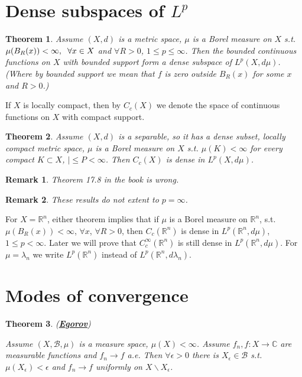 \documentclass{article}
\newtheorem{theorem}{Theorem}[section]
\newtheorem*{remark}{Remark}
\theoremstyle{definition}
\newcommand{\R}{\mathbb{R}}
\newcommand{\C}{\mathbb{C}}
\newcommand{\tmm}{\hspace{2mm}}
\newcommand{\B}{\mathscr{B}}
\begin{document}
\section{Dense subspaces of $L^p$}
\begin{theorem}
    Assume $(X,d)$ is a metric space, $\mu$ is a Borel measure on $X$ s.t. $\mu(B_R(x))<\infty,\tmm \forall x\in X$ and 
    $\forall R>0$, $1\leq p\leq \infty$. Then the bounded continuous functions on $X$ with bounded support form a dense subspace of $L^p(X,d\mu)$.
    (Where by bounded support we mean that $f$ is zero outside $B_R(x)$ for some $x$ and $R>0$.)
\end{theorem}

If $X$ is locally compact, then by $C_c(X)$ we denote the space of continuous functions on $X$ with compact support.

\begin{theorem}
    Assume $(X,d)$ is a separable, so it has a dense subset, locally compact metric space, $\mu$ is a Borel measure on $X$ s.t. $\mu(K)<\infty$ for every compact $K\subset X$, $|\leq P<\infty$. Then $C_c(X)$ is dense in $L^p(X,d\mu)$.
\end{theorem}

\begin{remark}
    Theorem 17.8 in the book is wrong.
\end{remark}

\begin{remark}
    These results do not extent to $p=\infty$.
\end{remark}
For $X=\R^n$, either theorem implies that if $\mu$ is a Borel measure on $\R^n$, s.t. $\mu(B_R(x))<\infty$, $\forall x$, $\forall R>0$, then
$C_c(\R^n)$ is dense in $L^p(\R^n,d\mu)$, $1\leq p<\infty$. Later we will prove that $C_c^\infty (\R^n)$ is still dense in $L^p(\R^n,d\mu)$.
 For $\mu=\lambda_n$ we write $L^p(\R^n)$ instead of $L^p(\R^n,d\lambda_n)$.



\section{Modes of convergence}
\begin{theorem}(\underline{\textbf{Egorov}})

    Assume $(X,\B,\mu)$ is a measure space, $\mu(X)<\infty$. Assume $f_n,f:X\rightarrow\C$ are measurable functions and 
    $f_n\rightarrow f$ a.e. Then $\forall \epsilon>0$ there is $X_\epsilon \in\B$ s.t. $\mu(X_\epsilon)<\epsilon$ and $f_n\rightarrow f$ uniformly on $X\backslash X_\epsilon$. 
\end{theorem}
\end{document}
